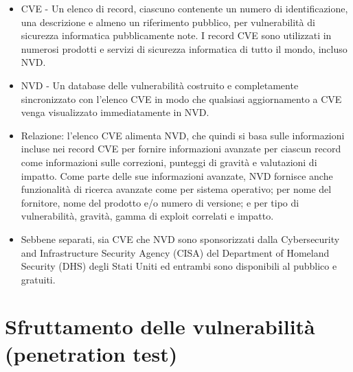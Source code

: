 \begin{itemize}
\item CVE - Un elenco di record, ciascuno contenente un numero di identificazione, una descrizione e almeno un riferimento pubblico, per vulnerabilità di sicurezza informatica pubblicamente note. I record CVE sono utilizzati in numerosi prodotti e servizi di sicurezza informatica di tutto il mondo, incluso NVD.
\item NVD - Un database delle vulnerabilità costruito e completamente sincronizzato con l'elenco CVE in modo che qualsiasi aggiornamento a CVE venga visualizzato immediatamente in NVD.
\item Relazione: l'elenco CVE alimenta NVD, che quindi si basa sulle informazioni incluse nei record CVE per fornire informazioni avanzate per ciascun record come informazioni sulle correzioni, punteggi di gravità e valutazioni di impatto. Come parte delle sue informazioni avanzate, NVD fornisce anche funzionalità di ricerca avanzate come per sistema operativo; per nome del fornitore, nome del prodotto e/o numero di versione; e per tipo di vulnerabilità, gravità, gamma di exploit correlati e impatto.

\item Sebbene separati, sia CVE che NVD sono sponsorizzati dalla Cybersecurity and Infrastructure Security Agency (CISA) del Department of Homeland Security (DHS) degli Stati Uniti ed entrambi sono disponibili al pubblico e gratuiti.
\end{itemize} 



\section{  Sfruttamento delle vulnerabilità (penetration test) }

